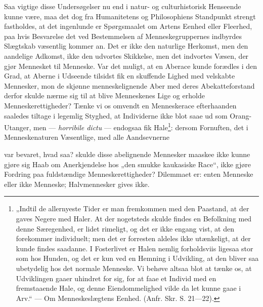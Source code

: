 \documentclass[12pt,a4paper]{book}
\begin{document}
Saa vigtige disse Undersøgelser nu end i natur- og culturhistorisk Henseende
kunne være, maa det dog fra Humanitetens og Philosophiens Standpunkt strengt
fastholdes, at det ingenlunde er Spørgsmaalet om Artens Eenhed eller Fleerhed,
paa hvis Besvarelse det ved Bestemmelsen af Menneskegruppernes indbyrdes
Slægtskab væsentlig kommer an. Det er ikke den naturlige Herkomst, men den
aandelige Adkomst, ikke den udvortes Skikkelse, men det indvortes Væsen, der
gjør Mennesket til Menneske. Var det muligt, at en Aberace kunde forædles i den
Grad, at Aberne i Udseende tilsidst fik en skuffende Lighed med velskabte
Mennesker, mon de skjønne menneskelignende Aber med deres Abekatteforstand
derfor skulde nærme sig til at blive Menneskenes Lige og erholde
Menneskerettigheder? Tænke vi os omvendt en Menneskerace efterhaanden saaledes
tiltage i legemlig Styghed, at Individerne ikke blot saae ud som Orang-Utanger,
men --- \textit{horribile dictu} --- endogsaa fik Hale\footnote{„Indtil de
allernyeste Tider er man fremkommen med den Paastand, at der gaves Negere med
Haler. At der nogetsteds skulde findes en Befolkning med denne Særegenhed, er
lidet rimeligt, og det er ikke engang vist, at den forekommer individuelt; men
det er forresten aldeles ikke utænkeligt, at der kunde findes saadanne. I
Fosterlivet er Halen nemlig forholdsviis ligesaa stor som hos Hunden, og det er
kun ved en Hemning i Udvikling, at den bliver saa ubetydelig hos det normale
Menneske. Vi behøve altsaa blot at tænke os, at Udviklingen gaaer uhindret for
sig, for at faae et Individ med en fremstaaende Hale, og denne Eiendommelighed
vilde da let kunne gaae i Arv.“ --- Om Menneskeslægtens Eenhed. (Anfr. Skr.
S. 21---22).}: dersom Fornuften, det i Menneskenaturen Væsentlige, med alle
Aandsevnerne

\setcounter{footnote}{0}
var bevaret, hvad saa? skulde disse abelignende Mennesker maaskee ikke kunne
gjøre sig Haab om Anerkjendelse hos „den smukke kaukasiske Race“, ikke gjøre
Fordring paa fuldstændige Menneskerettigheder? Dilemmaet er: enten Menneske
eller ikke Menneske; Halvmennesker gives ikke.
\end{document}
